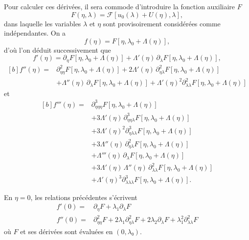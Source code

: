 \documentclass[12pt, final]{amsart}
\begin{document}
Pour calculer ces dérivées, il sera commode d'introduire la fonction auxiliaire
\(F\)
\begin{equation}
  F(\eta, \lambda)=\mathcal F[u_0(\lambda)+U(\eta), \lambda],
\end{equation}
dans laquelle les variables \(\lambda\) et \(\eta\) sont provisoirement
considérées comme indépendantes. On a
\begin{equation}
  f(\eta)=F[\eta, \lambda_0+\Lambda(\eta)],
\end{equation}
d'où l'on déduit successivement que
\begin{equation}
  \label{eq:20211112162417}
  f'(\eta)=\partial_\eta F[\eta, \lambda_0+\Lambda(\eta)]
  +\Lambda'(\eta)\,\partial_\lambda F[\eta, \lambda_0+\Lambda(\eta)],
\end{equation}
\begin{equation}
  \begin{aligned}[b]
    \label{eq:20211112165810}
    f''(\eta)={}&\partial_{\eta\eta}^2F[\eta, \lambda_0+\Lambda(\eta)]
    +2\Lambda'(\eta)\,\partial_{\eta\lambda}^2F[\eta, \lambda_0+\Lambda(\eta)]\\
    &+\Lambda''(\eta)\,\partial_\lambda F[\eta, \lambda_0+\Lambda(\eta)]
    +\Lambda'(\eta)^2\partial_{\lambda\lambda}^2F[\eta, \lambda_0+\Lambda(\eta)]
  \end{aligned}
\end{equation}
et
\begin{equation}
  \label{eq:20211112173223}
  \begin{aligned}[b]
    f'''(\eta)={}&\partial_{\eta\eta\eta}^3F[\eta, \lambda_0+\Lambda(\eta)]\\
    &+3\Lambda'(\eta)\,\partial_{\eta\eta\lambda}^3F[\eta, \lambda_0+\Lambda(\eta)]\\
    &+3\Lambda'(\eta)^2\partial_{\eta\lambda\lambda}^3F[\eta, \lambda_0+\Lambda(\eta)]\\
    &+3\Lambda''(\eta)\,\partial_{\eta\lambda}^2F[\eta, \lambda_0+\Lambda(\eta)]\\
    &+\Lambda'''(\eta)\,\partial_\lambda F[\eta, \lambda_0+\Lambda(\eta)]\\
    &+3\Lambda'(\eta)\,\Lambda''(\eta)\,\partial_{\lambda\lambda}^2F[\eta, \lambda_0+\Lambda(\eta)]\\
    &+\Lambda'(\eta)^3\partial_{\lambda\lambda\lambda}^3F[\eta, \lambda_0+\Lambda(\eta)].
  \end{aligned}
\end{equation}

En \(\eta=0\), les relations précédentes s'écrivent
\begin{align}
  f'(0)={}&\partial_\eta F+\lambda_1\partial_\lambda F\\
  f''(0)={}&\partial_{\eta\eta}^2F+2\lambda_1\partial_{\eta\lambda}^2F
             +2\lambda_2\partial_\lambda F+\lambda_1^2\partial_{\lambda\lambda}^2F
\end{align}
où \(F\) et ses dérivées sont évaluées en \((0, λ₀)\).
\end{document}
